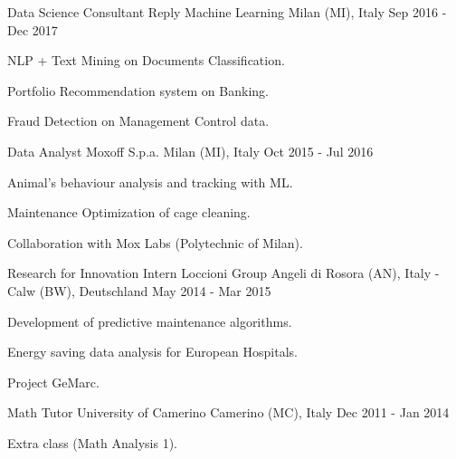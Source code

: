 \begin{cventries}
  \cventry
    {Data Science Consultant} %
    {Reply Machine Learning} %
    {Milan (MI), Italy} %
    {Sep 2016 - Dec 2017} %
    {
     \begin{cvitems} %
        \item {NLP + Text Mining on Documents Classification.}
        \item {Portfolio Recommendation system on Banking.}
        \item {Fraud Detection on Management Control data.}
      \end{cvitems}
    }

 \cventry
    {Data Analyst} %
    {Moxoff S.p.a.} %
    {Milan (MI), Italy} %
    {Oct 2015 - Jul 2016} %
    {
     \begin{cvitems} %
        \item {Animal's behaviour analysis and tracking with ML.}
        \item {Maintenance Optimization of cage cleaning.}
        \item {Collaboration with Mox Labs (Polytechnic of Milan).}
      \end{cvitems}
    }

  \cventry
    {Research for Innovation Intern} %
    {Loccioni Group} %
    {Angeli di Rosora (AN), Italy - Calw (BW), Deutschland} %
    {May 2014 - Mar 2015} %
    {
      \begin{cvitems} %
        \item {Development of predictive maintenance algorithms.}
        \item {Energy saving data analysis for European Hospitals.}
        \item {Project GeMarc.}
      \end{cvitems}
    }

  \cventry
    {Math Tutor} %
    {University of Camerino} %
    {Camerino (MC), Italy} %
    {Dec 2011 - Jan 2014} %
    {
      \begin{cvitems} %
        \item {Extra class (Math Analysis 1).}
       \end{cvitems}
    }

\end{cventries}
